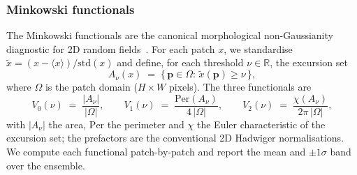 \documentclass[11pt]{article}
\theoremstyle{definition}
\begin{document}
\subsubsection{Minkowski functionals}
\label{sec:fg_minkowski}

The Minkowski functionals are the canonical morphological non-Gaussianity
diagnostic for 2D random fields~\cite{mecke1994minkowski,
schmalzing1997minkowski}. For each patch $x$, we standardise
$\tilde x=(x-\langle x\rangle)/\mathrm{std}(x)$ and define, for each
threshold $\nu\in\mathbb R$, the excursion set
\begin{equation}
  A_\nu(x) \;=\; \bigl\{\,\bm p\in\Omega:\, \tilde x(\bm p)\ge\nu\,\bigr\},
\end{equation}
where $\Omega$ is the patch domain ($H\times W$ pixels). The three
functionals are
\begin{equation}
  V_0(\nu)\;=\;\frac{|A_\nu|}{|\Omega|},\qquad
  V_1(\nu)\;=\;\frac{\mathrm{Per}(A_\nu)}{4\,|\Omega|},\qquad
  V_2(\nu)\;=\;\frac{\chi(A_\nu)}{2\pi\,|\Omega|},
  \label{eq:mf_def}
\end{equation}
with $|A_\nu|$ the area, $\mathrm{Per}$ the perimeter and $\chi$ the
Euler characteristic of the excursion set; the prefactors are the
conventional 2D Hadwiger normalisations. We compute each functional
patch-by-patch and report the mean and $\pm1\sigma$ band over the
ensemble.
\end{document}

